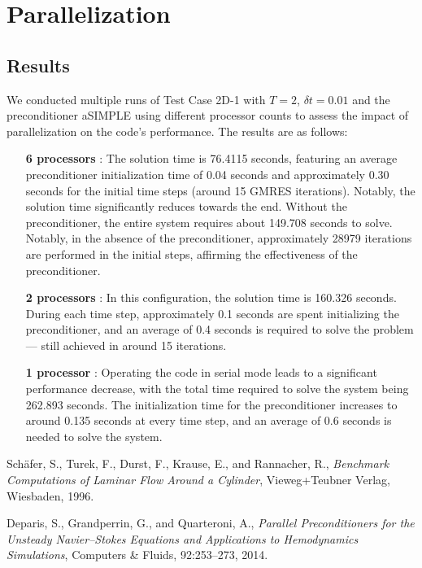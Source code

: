 \documentclass{article}
\begin{document}
\section{Parallelization}

\subsection*{Results}
We conducted multiple runs of Test Case 2D-1 with \(T = 2\), \(\delta t = 0.01\) and the preconditioner aSIMPLE using different processor counts to assess the impact of parallelization on the code's performance. The results are as follows:

\begin{itemize}
    \item [\textbf{6 processors}]: The solution time is 76.4115 seconds, featuring an average preconditioner initialization time of 0.04 seconds and approximately 0.30 seconds for the initial time steps (around 15 GMRES iterations). Notably, the solution time significantly reduces towards the end. Without the preconditioner, the entire system requires about 149.708 seconds to solve. Notably, in the absence of the preconditioner, approximately 28979 iterations are performed in the initial steps, affirming the effectiveness of the preconditioner.

    \item[\textbf{2 processors}]: In this configuration, the solution time is 160.326 seconds. During each time step, approximately 0.1 seconds are spent initializing the preconditioner, and an average of 0.4 seconds is required to solve the problem — still achieved in around 15 iterations.

    \item[\textbf{1 processor}]: Operating the code in serial mode leads to a significant performance decrease, with the total time required to solve the system being 262.893 seconds. The initialization time for the preconditioner increases to around 0.135 seconds at every time step, and an average of 0.6 seconds is needed to solve the system.
\end{itemize}




\begin{thebibliography}{99}
  Schäfer, S., Turek, F., Durst, F., Krause, E., and Rannacher, R.,
  \emph{Benchmark Computations of Laminar Flow Around a Cylinder},
  Vieweg+Teubner Verlag,
  Wiesbaden,
  1996.

  Deparis, S., Grandperrin, G., and Quarteroni, A.,
  \emph{Parallel Preconditioners for the Unsteady Navier–Stokes Equations and Applications to Hemodynamics Simulations},
  Computers \& Fluids,
  92:253–273,
  2014.
\end{thebibliography}
\end{document}
